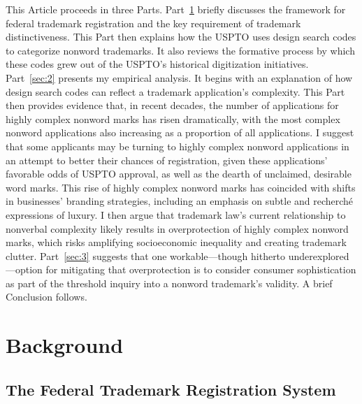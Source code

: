 \documentclass[letterpaper, 11pt, oneside]{article}
\begin{document}
This Article proceeds in three Parts. Part~\ref{sec:1} briefly discusses the framework for federal trademark registration and the key requirement of trademark distinctiveness. This Part then explains how the USPTO uses design search codes to categorize nonword trademarks. It also reviews the formative process by which these codes grew out of the USPTO's historical digitization initiatives. Part~\ref{sec:2} presents my empirical analysis. It begins with an explanation of how design search codes can reflect a trademark application's complexity. This Part then provides evidence that, in recent decades, the number of applications for highly complex nonword marks has risen dramatically, with the most complex nonword applications also increasing as a proportion of all applications. I suggest that some applicants may be turning to highly complex nonword applications in an attempt to better their chances of registration, given these applications' favorable odds of USPTO approval, as well as the dearth of unclaimed, desirable word marks. This rise of highly complex nonword marks has coincided with shifts in businesses' branding strategies, including an emphasis on subtle and recherché expressions of luxury. I then argue that trademark law's current relationship to nonverbal complexity likely results in overprotection of highly complex nonword marks, which risks amplifying socioeconomic inequality and creating trademark clutter. Part~\ref{sec:3} suggests that one workable—though hitherto underexplored—option for mitigating that overprotection is to consider consumer sophistication as part of the threshold inquiry into a nonword trademark's validity. A brief Conclusion follows.

\newpage

\section{Background}\label{sec:1}

\subsection{The Federal Trademark Registration System}\label{subsec:1A}
\end{document}

